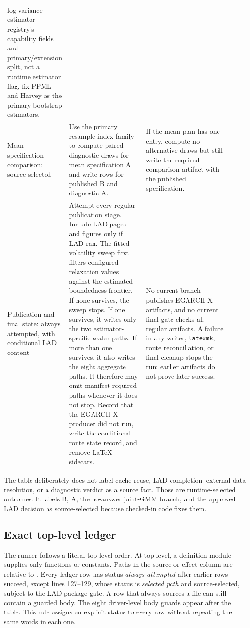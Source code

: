\documentclass[11pt]{article}
\DeclareRobustCommand{\code}[1]{%
  \ifmmode\text{\ttfamily\detokenize{#1}}\else\nolinkurl{#1}\fi}
\DeclareRobustCommand{\file}[1]{\path{#1}}
\begin{document}
\begin{landscape}
\begin{longtable}{@{}>{\raggedright\arraybackslash}p{0.20\linewidth}
  >{\raggedright\arraybackslash}p{0.34\linewidth}
  >{\raggedright\arraybackslash}p{0.38\linewidth}@{}}
log-variance estimator registry's capability fields and primary/extension split,
not a runtime estimator flag, fix PPML and Harvey as the primary bootstrap
estimators.\\
Mean-specification comparison: source-selected &
Use the primary resample-index family to compute paired diagnostic draws for
mean specification A and write rows for published B and diagnostic A. &
If the mean plan has one entry, compute no alternative draws but still write the
required comparison artifact with the published specification.\\
Publication and final state: always attempted, with conditional LAD content &
Attempt every regular publication stage. Include LAD pages and figures only if
LAD ran. The fitted-volatility sweep first filters configured relaxation values
against the estimated boundedness frontier. If none survives, the sweep stops. If
one survives, it writes only the two estimator-specific scalar paths. If more
than one survives, it also writes the eight aggregate paths. It therefore may
omit manifest-required paths whenever it does not stop.
Record that the EGARCH-X producer did not run, write the conditional-route state
record, and remove LaTeX sidecars. &
No current branch publishes EGARCH-X artifacts, and no current final gate checks
all regular artifacts. A failure in any writer,
\code{latexmk}, route reconciliation, or final cleanup stops the run; earlier
artifacts do not prove later success.\\
\bottomrule
\end{longtable}
\endgroup
\end{landscape}

The table deliberately does not label cache reuse, LAD completion, external-data
resolution, or a diagnostic verdict as a source fact. Those are runtime-selected
outcomes. It labels B, A, the no-answer joint-GMM branch, and the approved LAD
decision as source-selected because checked-in code fixes them.

\subsection{Exact top-level ledger}
\label{sec:runner-ledger}

The runner follows a literal top-level order. At top level, a definition module
supplies only functions or constants. Paths in the source-or-effect column are relative to
\file{scripts-paper/}.
Every ledger row has status \emph{always attempted} after earlier rows succeed,
except lines 127--129, whose status is \emph{selected path} and source-selected, subject to
the LAD package gate. A row that always sources a file can still contain a
guarded body. The eight driver-level body guards appear after the table. This rule assigns an explicit
status to every row without repeating the same words in each one.
\end{document}
